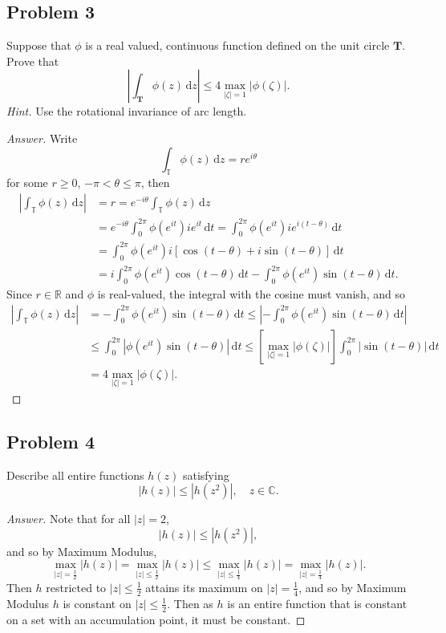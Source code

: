\documentclass[12pt]{article}
\newcommand{\cx}{\mathbb{C}}
\newcommand{\real}{\mathbb{R}}
\newcommand{\ita}[1]{\textit{#1}}
\newcommand\paren[1]{\left( #1 \right)}
\newcommand{\sqbrack}[1]{\left [ #1 \right ]}
\newcommand{\abs}[1]{\left| #1 \right|}
\renewcommand{\i}[4]{\int_{#1}^{#2} {#3} \, \mathrm{d} {#4} }
\theoremstyle{definition}
\begin{document}
\subsection{Problem 3 \texorpdfstring{\cite{Christian}}{}}
Suppose that $\phi$ is a real valued, continuous function defined on the unit circle $\mathbf{T}$. Prove that 
\[
    \abs{ \i{\mathbf{T}}{}{\phi(z)}{z} } \leq 4 \max\limits_{\abs{\zeta} = 1} \abs{ \phi(\zeta) } . 
\]
\ita{Hint.} Use the rotational invariance of arc length. 
\begin{proof}[Answer]
    Write 
    \[
        \i{\mathbb{T}}{}{\phi(z)}{z} = r e^{i\theta}
    \]
    for some $r \geq 0$, $-\pi < \theta \leq \pi$, then 
    \begin{align*}
        \abs{ \i{\mathbb{T}}{}{\phi(z)}{z} } & = r = e^{-i\theta} \i{\mathbb{T}}{}{\phi(z)}{z} \\ 
        & = e^{-i \theta} \i{0}{2\pi}{ \phi \paren{ e^{it } } i e^{it} }{t} = \i{0}{2\pi}{ \phi \paren{ e^{it} } i e^{i (t - \theta) } }{t} \\ 
        & = \i{0}{2\pi}{ \phi \paren{ e^{it} } i \sqbrack{ \cos(t - \theta) + i \sin(t - \theta) } }{t} \\ 
        & = i \i{0}{2\pi}{ \phi \paren{ e^{it} } \cos(t - \theta) }{t} - \i{0}{2\pi}{ \phi \paren{ e^{it} } \sin(t - \theta) }{t} . 
    \end{align*}
    Since $r \in \real$ and $\phi$ is real-valued, the integral with the cosine must vanish, and so 
    \begin{align*}
        \abs{ \i{\mathbb{T}}{}{\phi(z)}{z} } & = - \i{0}{2\pi}{ \phi \paren{ e^{it} } \sin(t - \theta) }{t} \leq \abs{ - \i{0}{2\pi}{ \phi \paren{ e^{it} } \sin(t - \theta) }{t} } \\ 
        & \leq \i{0}{2\pi}{ \abs{ \phi \paren{ e^{it} } \sin(t - \theta) } }{t} \leq \sqbrack{ \max\limits_{\abs{\zeta} = 1} \abs{ \phi(\zeta) } } \i{0}{2\pi}{ \abs{ \sin(t-\theta)} }{t} \\ 
        & = 4 \max\limits_{\abs{\zeta} = 1} \abs{ \phi(\zeta) } . 
    \end{align*}
\end{proof}

\subsection{Problem 4 \texorpdfstring{\cite{Christian}}{}}
Describe all entire functions $h(z)$ satisfying 
\[
    \abs{ h(z) } \leq \abs{ h(z^2) } , \quad z \in \cx . 
\]
\begin{proof}[Answer]
    Note that for all $|z| = 2$, 
    \[
        \abs{ h \paren{ z } } \leq \abs{ h \paren{ z^2 } } , 
    \]
    and so by Maximum Modulus, 
    \[
        \max\limits_{\abs{z} = \frac{1}{2}} \abs{ h(z) } = \max\limits_{ \abs{z} \leq \frac{1}{2} } \abs{ h(z) } \leq \max\limits_{ \abs{z} \leq \frac{1}{4} } \abs{ h(z) } = \max\limits_{ \abs{z} = \frac{1}{4} } \abs{ h(z) } . 
    \]
    Then $h$ restricted to $\abs{z} \leq \frac{1}{2}$ attains its maximum on $\abs{z} = \frac{1}{4}$, and so by Maximum Modulus $h$ is constant on $\abs{z} \leq \frac{1}{2}$. Then as $h$ is an entire function that is constant on a set with an accumulation point, it must be constant. 
\end{proof}
\end{document}

